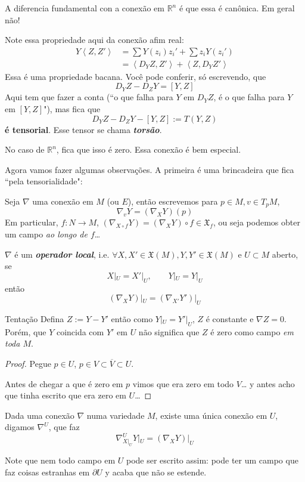 A diferencia fundamental con a conexão em \(\mathbb{R}^n\) é que essa é canônica. Em geral não!

Note essa propriedade aqui da conexão afim real:
\begin{align*}
Y\left<Z,Z'\right>&=\sum Y(z_i)z_i'+\sum z_i Y(z_i')\\
&=\left<D_YZ,Z'\right>+\left<Z,D_YZ'\right>
\end{align*}
Essa é uma propriedade bacana. Você pode conferir, só escrevendo, que
\[D_YZ-D_ZY=[Y,Z]\]
Aqui tem que fazer a conta (``o que falha para \(Y\) em  \(D_YZ\),  é o que falha para \(Y\) em \([Y,Z]\)"), mas fica que
\[D_YZ-D_ZY-[Y,Z]:=T(Y,Z)\]
\textbf{é tensorial}. Esse tensor se chama \textit{\textbf{torsão}}.

No caso de \(\mathbb{R}^n\), fica que isso é zero. Essa conexão é bem especial.

Agora vamos fazer algumas observações. A primeira é uma brincadeira que fica ``pela tensorialidade":

Seja \(\nabla\) uma conexão em \(M\) (ou \(E\)), então escrevemos para \(p \in M, v \in T_pM\),
\[\nabla_v Y = (\nabla_X Y)(p)\]
Em particular, \(f :N \to M\), \((\nabla_{X \circ f}Y)=(\nabla_XY)\circ f\in \mathfrak{X}_f\), ou seja podemos obter um campo \textit{ao longo de \(f\)}…  
\begin{prop}\leavevmode
\(\nabla\) é um \textit{\textbf{operador local}}, i.e. \(\forall  X,X' \in \mathfrak{X}(M), Y,Y' \in \mathfrak{X}(M)\) e \(U \subset M\) aberto, se
\[X|_{ U}=X'|_{U},\qquad Y|_{U}=Y|_{U}\]
então
\[(\nabla_XY)|_{U}=(\nabla_{X'}Y')|_{U}\]
\end{prop}
\begin{thing7}{Tentação}\leavevmode
Defina \(Z:=Y-Y'\)  então como \(Y|_{ U}=Y'|_{U}\), \(Z\) é constante e \(\nabla Z=0\). Porém, que \(Y\) coincida com \(Y'\) em \(U\) não significa que \(Z\) é zero como campo \textit{em toda \(M\)}. 
\end{thing7}
\begin{proof}\leavevmode
Pegue \(p \in U\), \(p \in V \subset \overline{V}\subset U\).


	Antes de chegar a que é zero em \(p\) vimos que era zero em todo \(V\)… y antes acho que tinha escrito que era zero em \(U\)…
\end{proof}

\begin{coro}\leavevmode
Dada uma conexão \(\nabla\) numa variedade \(M\), existe uma única conexão em \(U\), digamos \(\nabla^U\), que faz
\[\nabla^U_{X|_{U}}Y|_{U}=(\nabla_XY)|_{U}\]
\end{coro}
\begin{remark}\leavevmode
Note que  nem todo campo em \(U\) pode ser escrito assim: pode ter um campo que faz coisas estranhas em \(\partial U\) y acaba que não se estende.
\end{remark}


